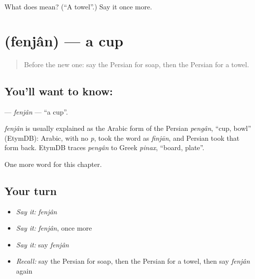 \begin{tcolorbox}[breakable,colback=teal!4,colframe=teal!35!black,title={Before you move on}]
What does  mean? (\textquotedblleft{}A towel\textquotedblright{}.) Say it once more.
\end{tcolorbox}
\section[\texorpdfstring{\fa{فنجان} (fenjân)}{فنجان (fenjân)}]{ (fenjân) — a cup}

\label{lesson:FA-C95-fenjan}



\begin{quote}
Before the new one: say the Persian for soap, then the Persian for a towel.
\end{quote}

\subsection*{You'll want to know: }
\textbf{} — \emph{fenjân} — \textquotedblleft{}a cup\textquotedblright{}.

\begin{cousinweb}
\emph{fenjân} is usually explained as the Arabic form of the Persian \emph{pengân}, \textquotedblleft{}cup, bowl\textquotedblright{} (EtymDB): Arabic, with no \emph{p}, took the word as \emph{finjān}, and Persian took that form back. EtymDB traces \emph{pengân} to Greek \emph{pinax}, \textquotedblleft{}board, plate\textquotedblright{}.
\end{cousinweb}

\begin{grammarlens}[title={What you've built}]
One more word for this chapter.
\end{grammarlens}

\subsection*{Your turn}
\begin{itemize}
\raggedright
  \item \emph{Say it:} \emph{fenjân}
  \item \emph{Say it:} \emph{fenjân}, once more
  \item \emph{Say it:} say \emph{fenjân}
  \item \emph{Recall:} say the Persian for soap, then the Persian for a towel, then say \emph{fenjân} again
\end{itemize}

